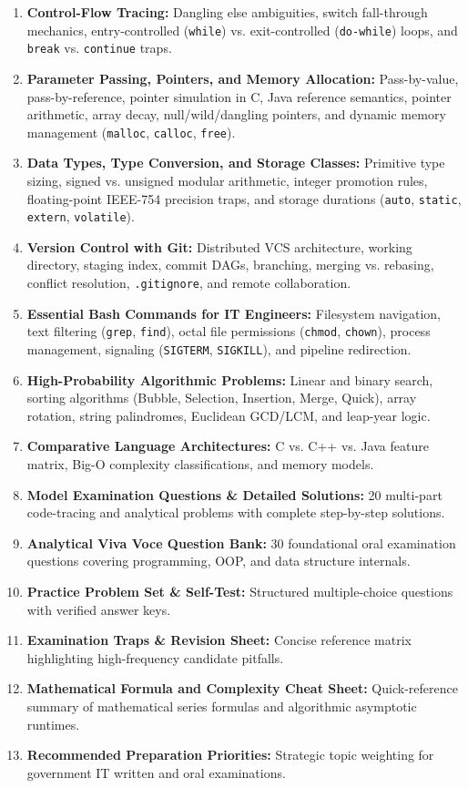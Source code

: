\begin{enumerate}[label=\bfseries\arabic*.]
    \item \textbf{Control-Flow Tracing:} Dangling else ambiguities, switch fall-through mechanics, entry-controlled (\texttt{while}) vs. exit-controlled (\texttt{do-while}) loops, and \texttt{break} vs. \texttt{continue} traps.
    \item \textbf{Parameter Passing, Pointers, and Memory Allocation:} Pass-by-value, pass-by-reference, pointer simulation in C, Java reference semantics, pointer arithmetic, array decay, null/wild/dangling pointers, and dynamic memory management (\texttt{malloc}, \texttt{calloc}, \texttt{free}).
    \item \textbf{Data Types, Type Conversion, and Storage Classes:} Primitive type sizing, signed vs. unsigned modular arithmetic, integer promotion rules, floating-point IEEE-754 precision traps, and storage durations (\texttt{auto}, \texttt{static}, \texttt{extern}, \texttt{volatile}).
    \item \textbf{Version Control with Git:} Distributed VCS architecture, working directory, staging index, commit DAGs, branching, merging vs. rebasing, conflict resolution, \texttt{.gitignore}, and remote collaboration.
    \item \textbf{Essential Bash Commands for IT Engineers:} Filesystem navigation, text filtering (\texttt{grep}, \texttt{find}), octal file permissions (\texttt{chmod}, \texttt{chown}), process management, signaling (\texttt{SIGTERM}, \texttt{SIGKILL}), and pipeline redirection.
    \item \textbf{High-Probability Algorithmic Problems:} Linear and binary search, sorting algorithms (Bubble, Selection, Insertion, Merge, Quick), array rotation, string palindromes, Euclidean GCD/LCM, and leap-year logic.
    \item \textbf{Comparative Language Architectures:} C vs. C++ vs. Java feature matrix, Big-O complexity classifications, and memory models.
    \item \textbf{Model Examination Questions \& Detailed Solutions:} 20 multi-part code-tracing and analytical problems with complete step-by-step solutions.
    \item \textbf{Analytical Viva Voce Question Bank:} 30 foundational oral examination questions covering programming, OOP, and data structure internals.
    \item \textbf{Practice Problem Set \& Self-Test:} Structured multiple-choice questions with verified answer keys.
    \item \textbf{Examination Traps \& Revision Sheet:} Concise reference matrix highlighting high-frequency candidate pitfalls.
    \item \textbf{Mathematical Formula and Complexity Cheat Sheet:} Quick-reference summary of mathematical series formulas and algorithmic asymptotic runtimes.
    \item \textbf{Recommended Preparation Priorities:} Strategic topic weighting for government IT written and oral examinations.
\end{enumerate}

